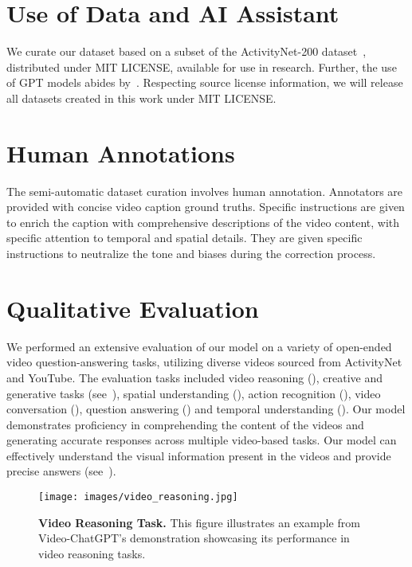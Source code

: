 \section{Use of Data and AI Assistant}
We curate our dataset based on a subset of the ActivityNet-200 dataset~\cite{caba2015activitynet}, distributed under MIT LICENSE, available for use in research. 
Further, the use of GPT models abides by~\cite{openai}. 
Respecting source license information, we will release all datasets created in this work under MIT LICENSE.

\section{Human Annotations}
The semi-automatic dataset curation involves human annotation. Annotators are provided with concise video caption ground truths. Specific instructions are given to enrich the caption with comprehensive descriptions of the video content, with specific attention to temporal and spatial details. They are given specific instructions to neutralize the tone and biases during the correction process.

\section{Qualitative Evaluation}
We performed an extensive evaluation of our model on a variety of open-ended video question-answering tasks, utilizing diverse videos sourced from ActivityNet and YouTube. The evaluation tasks included video reasoning (), creative and generative tasks (see~), spatial understanding (), action recognition (), video conversation (), question answering () and temporal understanding (). Our model demonstrates proficiency in comprehending the content of the videos and generating accurate responses across multiple video-based tasks. Our model can effectively understand the visual information present in the videos and provide precise answers (see~).

\begin{figure*}[h]
  \centering
  \texttt{[image: images/video\_reasoning.jpg]}
  \caption{\textbf{Video Reasoning Task.} This figure illustrates an example from Video-ChatGPT's demonstration showcasing its performance in video reasoning tasks.}
  \label{fig:video_reasoning}
\end{figure*}

